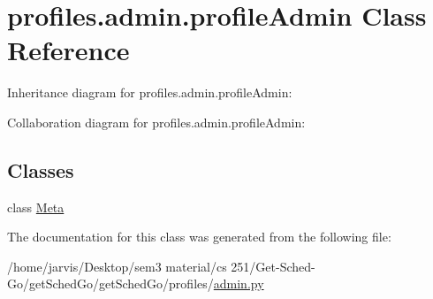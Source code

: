 \hypertarget{classprofiles_1_1admin_1_1profileAdmin}{}\section{profiles.\+admin.\+profile\+Admin Class Reference}
\label{classprofiles_1_1admin_1_1profileAdmin}


Inheritance diagram for profiles.\+admin.\+profile\+Admin\+:


Collaboration diagram for profiles.\+admin.\+profile\+Admin\+:
\subsection*{Classes}
\begin{DoxyCompactItemize}
\item 
class \hyperlink{classprofiles_1_1admin_1_1profileAdmin_1_1Meta}{Meta}
\end{DoxyCompactItemize}


The documentation for this class was generated from the following file\+:\begin{DoxyCompactItemize}
\item 
/home/jarvis/\+Desktop/sem3 material/cs 251/\+Get-\/\+Sched-\/\+Go/get\+Sched\+Go/get\+Sched\+Go/profiles/\hyperlink{profiles_2admin_8py}{admin.\+py}\end{DoxyCompactItemize}
